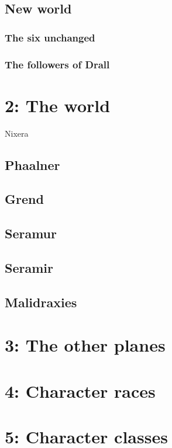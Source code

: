 \documentclass[a4paper]{book}
\begin{document}
\subsection{New world}

\subsubsection{The six unchanged}

\subsubsection{The followers of Drall}

\section{2: The world}
Nixera
\subsection{Phaalner}

\subsection{Grend}

\subsection{Seramur}

\subsection{Seramir}

\subsection{Malidraxies}

\section{3: The other planes}

\section{4: Character races}

\section{5: Character classes}
\end{document}
